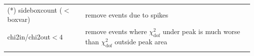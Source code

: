 \documentclass[iop, apj]{emulateapj}
\newcommand{\?}{\stackrel{?}{=}}
\begin{document}
\begin{table}[t]
\begin{center}
\begin{tabular}{ll}
(*) sideboxcount ($<$boxvar) & remove events due to spikes\\
chi2in/chi2out$<4$ & remove events where $\chi^2_\mathrm{dof}$ under peak is much worse than $\chi^2_\mathrm{dof}$ outside peak area\\
 \hline 
   \label{table:counta}
  	\end{tabular}
	   \end{center}
   \end{table}
%
\end{document}
